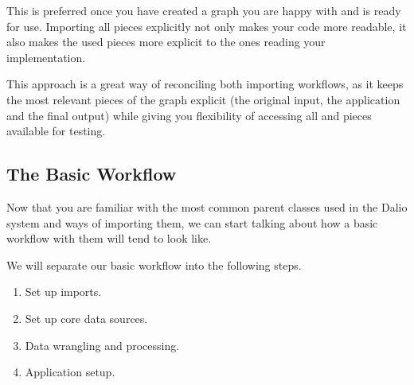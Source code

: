 \documentclass[letterpaper,10pt,english]{sphinxmanual}
\begin{document}
This is preferred once you have created a graph you are happy with and is ready for use. Importing all pieces explicitly not only makes your code more readable, it also makes the used pieces more explicit to the ones reading your implementation.


\begin{sphinxVerbatim}[commandchars=\\\{\}]
    
   

   
   

   
\end{sphinxVerbatim}

This approach is a great way of reconciling both importing workflows, as it keeps the most relevant pieces of the graph explicit (the original input, the application and the final output) while giving you flexibility of accessing all  and  pieces available for testing.


\subsection{The Basic Workflow}
\label{\detokenize{beginners-guide:the-basic-workflow}}
Now that you are familiar with the most common parent classes used in the Dal\sphinxhyphen{}io system and ways of importing them, we can start talking about how a basic workflow with them will tend to look like.

We will separate our basic workflow into the following steps.
\begin{enumerate}
%
\item {} 
Set up imports.

\item {} 
Set up core data sources.

\item {} 
Data wrangling and processing.

\item {} 
Application set\sphinxhyphen{}up.

\end{enumerate}
\end{document}

